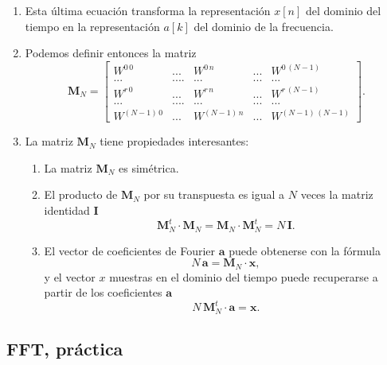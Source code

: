 \begin{enumerate}
\item Esta \'{u}ltima ecuaci\'{o}n transforma 
la representaci\'{o}n $x[n]$ del dominio del tiempo en 
la representaci\'{o}n $a[k]$ del dominio de la frecuencia.

\item Podemos definir entonces la matriz
\begin{equation}
\mathbf{M}_{N} = 
\left[ \begin{array}{cccccc}
W^{0 \, 0} & ... & W^{0 \, n} & ... & W^{0 \, (N-1)} \\
... & .... & ... & ... & ... \\
W^{r \, 0} & ... & W^{r \, n} & ... & W^{r \, (N-1)} \\
... & .... & ... & ... & ... \\
W^{(N-1) \, 0} & ... & W^{(N-1) \, n} & ... & W^{(N-1) \, (N-1)}
\end{array} \right].
\end{equation}

\item La matriz $\mathbf{M}_{N}$ tiene propiedades interesantes:
\begin{enumerate}
\item La matriz $\mathbf{M}_{N}$ es simétrica.
\item El producto de $\mathbf{M}_{N}$ por su transpuesta es igual a $N$ veces la matriz identidad 
$\mathbf{I}$
\begin{equation}
  \mathbf{M}_{N}^{t} \cdot \mathbf{M}_{N} = \mathbf{M}_{N} \cdot \mathbf{M}_{N}^{t} = N \, \mathbf{I}.
\end{equation}
\item El vector de coeficientes de Fourier $\mathbf{a}$
puede obtenerse con la fórmula
\begin{equation}
 N \, \mathbf{a} = \mathbf{M}_{N} \cdot \mathbf{x},
\end{equation}
y el vector $x$ muestras en el dominio del tiempo puede recuperarse a partir de los coeficientes 
$\mathbf{a}$
\begin{equation}
 N \, \mathbf{M}_{N}^{t} \cdot \mathbf{a} = \mathbf{x}.
\end{equation}


\end{enumerate}


\end{enumerate}


\subsection{FFT, práctica}

